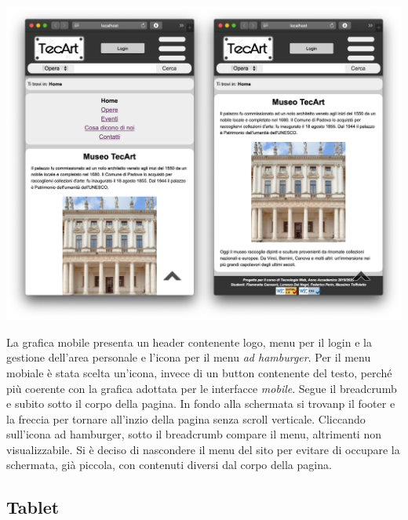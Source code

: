 \begin{center}
	\includegraphics[scale=0.27]{img/Mobile-pres}
\end{center}

La grafica mobile presenta un header contenente logo, menu per il login e la gestione dell'area personale e l'icona per il menu \textit{ad hamburger}. Per il menu mobiale è stata scelta un'icona, invece di un button contenente del testo, perché più coerente con la grafica adottata per le interfacce \textit{mobile}. Segue il breadcrumb e subito sotto il corpo della pagina. In fondo alla schermata si trovanp il footer e la freccia per tornare all'inzio della pagina senza scroll verticale. Cliccando sull'icona ad hamburger, sotto il breadcrumb compare il menu, altrimenti non visualizzabile. Si è deciso di nascondere il menu del sito per evitare di occupare la schermata, già piccola, con contenuti diversi dal corpo della pagina.

\subsection{Tablet}
\label{presentazione-tablet}


